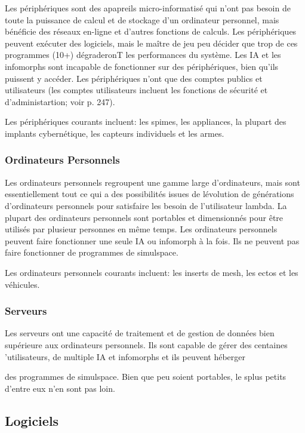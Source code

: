 Les périphériques sont des apapreils micro-informatisé qui n'ont pas besoin de toute la puissance de calcul et de stockage d'un ordinateur personnel, mais bénéficie des réseaux en-ligne et d'autres fonctions de calculs. Les périphériques peuvent exécuter des logiciels, mais le maître de jeu peu décider que trop de ces programmes (10+) dégraderonT les performances du système. Les IA et les infomorphs sont incapable de fonctionner sur des périphériques, bien qu'ils puissent y accéder. Les périphériques n'ont que des comptes publics et utilisateurs (les comptes utilisateurs incluent les fonctions de sécurité et d'administartion; voir p. 247). 

Les périphériques courants incluent: les spimes, les appliances, la plupart des implants cybernétique, les capteurs individuels et les armes. 

\subsubsection{Ordinateurs Personnels} 

Les ordinateurs personnels regroupent une gamme large d'ordinateurs, mais sont essentiellement tout ce qui a des possibilités issues de lévolution de générations d'ordinateurs personnels pour satisfaire les besoin de l'utilisateur lambda. La plupart des ordinateurs personnels sont portables et dimensionnés pour être utilisés par plusieur personnes en même temps. Les ordinateurs personnels peuvent faire fonctionner une seule IA ou infomorph à la fois. Ils ne peuvent pas faire fonctionner de programmes de simulspace. 

Les ordinateurs personnels courants incluent: les inserts de mesh, les ectos et les véhicules. 

\subsubsection{Serveurs} 

Les serveurs ont une capacité de traitement et de gestion de données bien supérieure aux ordinateurs personnels. Ils sont capable de gérer des centaines 'utilisateurs, de multiple IA et infomorphs et ils peuvent héberger 

des programmes de simulspace. Bien que peu soient portables, le splus petits d'entre eux n'en sont pas loin. 

\subsection{Logiciels} 

